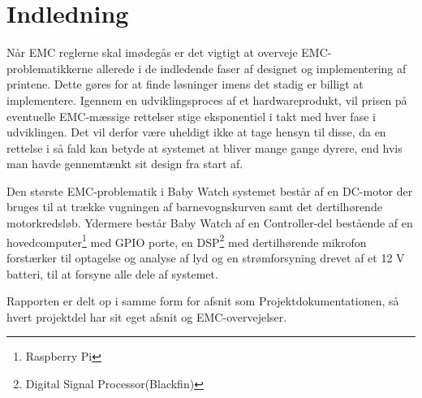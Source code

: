 \chapter{Indledning}

Når EMC reglerne skal imødegås er det vigtigt at overveje EMC-problematikkerne allerede i de indledende faser af designet og implementering af printene. Dette gøres for at finde løsninger imens det stadig er billigt at implementere. Igennem en udviklingsproces af et hardwareprodukt, vil prisen på eventuelle EMC-mæssige rettelser stige eksponentiel i takt med hver fase i udviklingen. Det vil derfor være uheldigt ikke at tage hensyn til disse, da en rettelse i så fald kan betyde at systemet at bliver mange gange dyrere, end hvis man havde gennemtænkt sit design fra start af.

Den største EMC-problematik i Baby Watch systemet består af en DC-motor der bruges til at trække vugningen af barnevognskurven samt det dertilhørende motorkredsløb. Ydermere består Baby Watch af en Controller-del bestående af en hovedcomputer\footnote{Raspberry Pi} med GPIO porte, en DSP\footnote{Digital Signal Processor(Blackfin)} med dertilhørende mikrofon forstærker til optagelse og analyse af lyd og en strømforsyning drevet af et 12 V batteri, til at forsyne alle dele af systemet.

Rapporten er delt op i samme form for afsnit som Projektdokumentationen, så hvert projektdel har sit eget afsnit og EMC-overvejelser.

